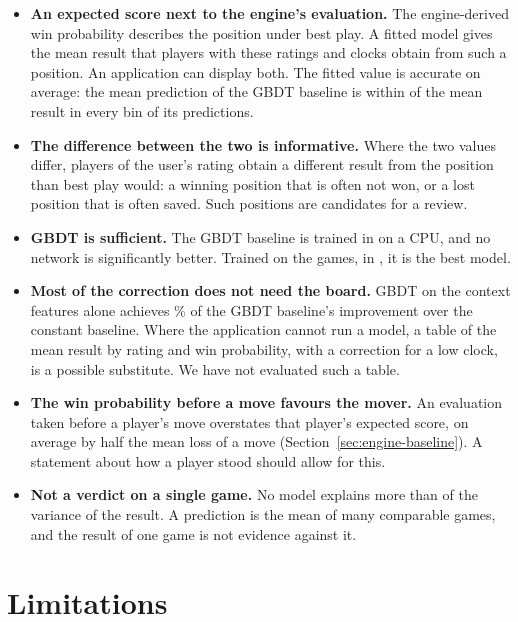 \documentclass[11pt]{article}
\begin{document}
\begin{itemize}
\item \textbf{An expected score next to the engine's evaluation.} The
engine-derived win probability describes the position under best play. A
fitted model gives the mean result that players with these ratings and clocks
obtain from such a position. An application can display both.\iflook{} The
fitted value is accurate on average: the mean prediction of the GBDT baseline
is within  of the mean result in every
bin of its predictions.\fi
\item \textbf{The difference between the two is informative.} Where the two
values differ, players of the user's rating obtain a different result from
the position than best play would: a winning position that is often not won,
or a lost position that is often saved. Such positions are candidates for a
review.
\item \textbf{GBDT is sufficient.} The GBDT baseline is trained in
 on a CPU, and no network is significantly better.\ifmore{}
Trained on  the games, in , it is the
best model.\fi
\item \textbf{Most of the correction does not need the board.} GBDT on the
context features alone achieves \% of the GBDT
baseline's improvement over the constant baseline. Where the application
cannot run a model, a table of the mean result by rating and win probability,
with a correction for a low clock, is a possible substitute. We have not
evaluated such a table.
\item \textbf{The win probability before a move favours the mover.} An
evaluation taken before a player's move overstates that player's expected
score, on average by half the mean loss of a move
(Section~\ref{sec:engine-baseline}). A statement about how a player stood
should allow for this.
\item \textbf{Not a verdict on a single game.} No model explains more than
 of the variance of the result. A prediction is the mean of many
comparable games, and the result of one game is not evidence against it.
\end{itemize}

\section{Limitations}
\label{sec:limits}
\end{document}
